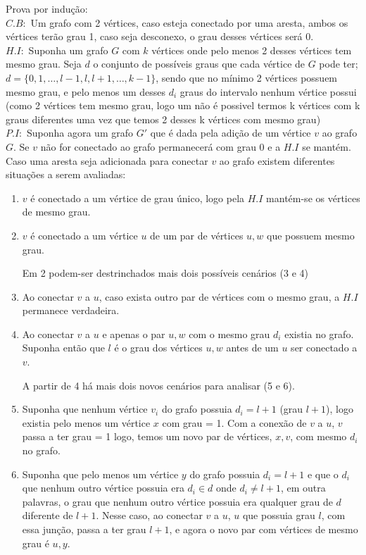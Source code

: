 \documentclass[12pt]{article}
\begin{document}
Prova por indução:\\

$C.B:$ Um grafo com 2 vértices, caso esteja conectado por uma aresta, ambos os vértices terão grau 1, caso seja desconexo, o grau desses vértices será 0. \\

$H.I:$ Suponha um grafo $G$ com $k$ vértices onde pelo menos 2 desses vértices tem mesmo grau. Seja $d$ o conjunto de possíveis graus que cada vértice de $G$ pode ter;  $d = \{0,1,\dots, l-1,l,l+1,\dots, k-1\}$, sendo que no mínimo 2 vértices possuem mesmo grau, e pelo menos um desses $d_i$ graus do intervalo nenhum vértice possui (como 2 vértices tem mesmo grau, logo um não é possivel termos k vértices com k graus diferentes uma vez que temos 2 desses k vértices com mesmo grau)\\

$P.I:$ Suponha agora um grafo $G'$ que é dada pela adição de um vértice $v$ ao grafo $G$. Se $v$ não for conectado ao grafo permanecerá com grau 0 e a $H.I$ se mantém. Caso uma aresta seja adicionada para conectar $v$ ao grafo existem diferentes situações a serem avaliadas:
\begin{enumerate}
    \item $v$ é conectado a um vértice de grau único, logo pela $H.I$ mantém-se os vértices de mesmo grau.
    \item $v$ é conectado a um vértice $u$ de um par de vértices $u,w$ que possuem mesmo grau.

Em 2 podem-ser destrinchados mais dois possíveis cenários (3 e 4)

    \item Ao conectar $v$ a $u$, caso exista outro par de vértices com o mesmo grau, a $H.I$ permanece verdadeira.
    
    \item Ao conectar $v$ a $u$ e apenas o par $u,w$ com o mesmo grau $d_i$ existia no grafo. Suponha então que $l$ é o grau dos vértices $u,w$ antes de um $u$ ser conectado a $v$.

A partir de 4 há mais dois novos cenários para analisar (5 e 6).

    \item Suponha que nenhum vértice $v_i$ do grafo possuia  $d_i = l + 1$ (grau $l+1$), logo existia pelo menos um vértice $x$ com grau = 1. Com a conexão de $v$ a $u$, $v$ passa a ter grau = 1 logo, temos um novo par de vértices, $x,v$, com mesmo $d_i$ no grafo.
    
    \item Suponha que pelo menos um vértice $y$ do grafo possuia $d_i = l+1$ e que o $d_i$ que nenhum outro vértice possuia era $d_i \in d $ onde $ d_i\neq l+1$, em outra palavras, o grau que nenhum outro vértice possuia era qualquer grau de $d$ diferente de $l+1$. Nesse caso, ao conectar $v$ a $u$, $u$ que possuia grau $l$, com essa junção, passa a ter grau $l+1$, e agora o novo par com vértices de mesmo grau é $u,y$.

\end{enumerate}
\end{document}
